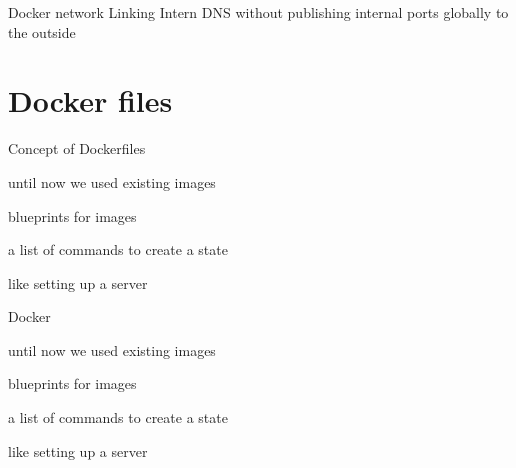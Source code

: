 \documentclass[10pt,aspectratio=\ratio,
compress
]{beamer}
\begin{document}

\begin{frame}{Docker network}
Linking 
Intern DNS
without publishing internal ports globally to the outside
\end{frame}


\section{Docker files}
\begin{frame}{Concept of Dockerfiles}
\item until now we used existing images
\item blueprints for images
\item a list of commands to create a state 
\item like setting up a server

\end{frame}

\begin{frame}{Docker}
\item until now we used existing images
\item blueprints for images
\item a list of commands to create a state 
\item like setting up a server
\end{frame}
\end{document}
